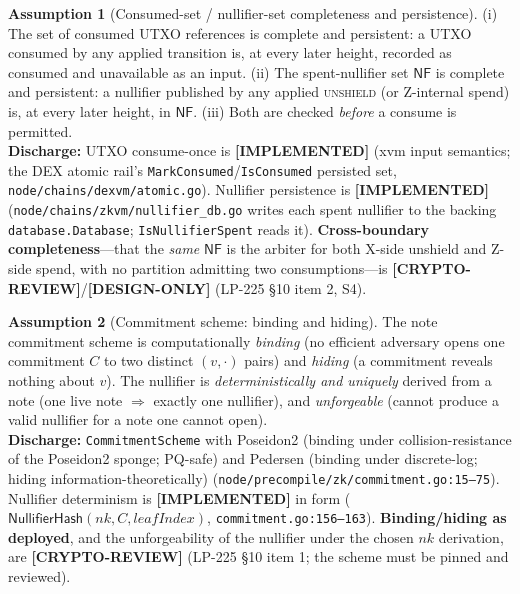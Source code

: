 \documentclass[11pt]{article}
\theoremstyle{definition}
\newtheorem{assumption}{Assumption}
\theoremstyle{remark}
\newcommand{\IMPL}{\textbf{[IMPLEMENTED]}}
\newcommand{\DESIGN}{\textbf{[DESIGN-ONLY]}}
\newcommand{\CRYPTO}{\textbf{[CRYPTO-REVIEW]}}
\newcommand{\NF}{\mathsf{NF}}
\begin{document}
\begin{assumption}[Consumed-set / nullifier-set completeness and persistence]
\label{a:sets}
(i) The set of consumed UTXO references is complete and persistent: a UTXO
consumed by any applied transition is, at every later height, recorded as
consumed and unavailable as an input. (ii) The spent-nullifier set $\NF$ is
complete and persistent: a nullifier published by any applied
\textsc{unshield} (or Z-internal spend) is, at every later height, in
$\NF$. (iii) Both are checked \emph{before} a consume is permitted.
\\\textbf{Discharge:} UTXO consume-once is \IMPL{} (xvm input semantics;
the DEX atomic rail's \texttt{MarkConsumed}/\texttt{IsConsumed} persisted
set, \texttt{node/chains/dexvm/atomic.go}). Nullifier persistence is
\IMPL{} (\texttt{node/chains/zkvm/nullifier\_db.go} writes each spent
nullifier to the backing \texttt{database.Database}; \texttt{IsNullifierSpent}
reads it). \textbf{Cross-boundary completeness}---that the \emph{same} $\NF$
is the arbiter for both X-side unshield and Z-side spend, with no partition
admitting two consumptions---is \CRYPTO{}/\DESIGN{} (LP-225 \S10 item 2, S4).
\end{assumption}

\begin{assumption}[Commitment scheme: binding and hiding]
\label{a:commit}
The note commitment scheme is computationally \emph{binding} (no efficient
adversary opens one commitment $C$ to two distinct $(v,\cdot)$ pairs) and
\emph{hiding} (a commitment reveals nothing about $v$). The nullifier is
\emph{deterministically and uniquely} derived from a note (one live note
$\Rightarrow$ exactly one nullifier), and \emph{unforgeable} (cannot
produce a valid nullifier for a note one cannot open).
\\\textbf{Discharge:} \texttt{CommitmentScheme} with Poseidon2 (binding
under collision-resistance of the Poseidon2 sponge; PQ-safe) and Pedersen
(binding under discrete-log; hiding information-theoretically)
(\texttt{node/precompile/zk/commitment.go:15--75}). Nullifier
determinism is \IMPL{} in form
($\textsf{NullifierHash}(\textit{nk},C,\textit{leafIndex})$,
\texttt{commitment.go:156--163}). \textbf{Binding/hiding as deployed},
and the unforgeability of the nullifier under the chosen $\textit{nk}$
derivation, are \CRYPTO{} (LP-225 \S10 item 1; the scheme must be pinned
and reviewed).
\end{assumption}
\end{document}
